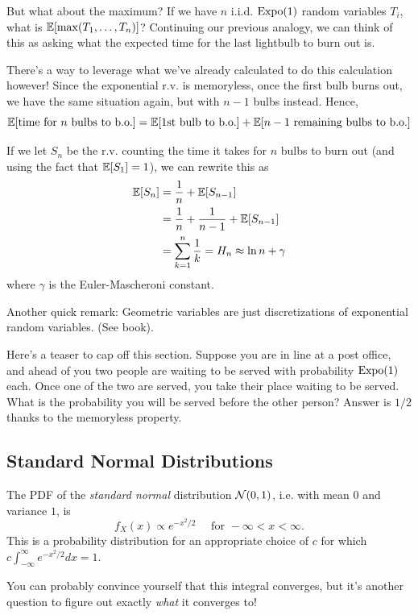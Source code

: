 \documentclass[11 pt]{scrartcl}
\begin{document}
But what about the maximum? If we have $n$ i.i.d. $\text{Expo}(1)$ random variables $T_i$, what is $\mathbb E[\max(T_1, \dots, T_n)]$? Continuing our previous analogy, we can think of this as asking what the expected time for the last lightbulb to burn out is. 

There's a way to leverage what we've already calculated to do this calculation however! Since the exponential r.v. is memoryless, once the first bulb burns out, we have the same situation again, but with $n-1$ bulbs instead. Hence,   
\[ \mathbb E[\text{time for }n\text{ bulbs to b.o.}] = \mathbb E[\text{1st bulb to b.o.}] + \mathbb E[n-1\text{ remaining bulbs to b.o.}]\]

If we let $S_n$ be the r.v. counting the time it takes for $n$ bulbs to burn out (and using the fact that $\mathbb E[S_1] = 1$), we can rewrite this as 
\begin{align*}
    \mathbb E[S_n] &= \dfrac{1}{n} + \mathbb E[S_{n-1}] \\ 
             &= \dfrac{1}{n} + \dfrac{1}{n-1} + \mathbb E[S_{n-1}] \\ 
             &= \sum_{k=1}^n \dfrac{1}{k} = H_n \approx \ln n + \gamma 
\end{align*}
where $\gamma$ is the Euler-Mascheroni constant. 

Another quick remark: Geometric variables are just discretizations of exponential random variables. (See book). 

Here's a teaser to cap off this section. Suppose you are in line at a post office, and ahead of you two people are waiting to be served with probability $\text{Expo}(1)$ each. Once one of the two are served, you take their place waiting to be served. What is the probability you will be served before the other person? Answer is $1/2$ thanks to the memoryless property. 

\subsection{Standard Normal Distributions}
\begin{definition}
    The PDF of the \emph{standard normal} distribution $\mathcal{N}(0,1)$, i.e. with mean $0$ and variance $1$, is 
    \[ f_X(x) \propto e^{-x^2/2} \quad \text{ for } -\infty < x < \infty.\] 
    This is a probability distribution for an appropriate choice of $c$ for which $c\int_{-\infty}^\infty e^{-x^2/2}dx = 1$. 
\end{definition}

You can probably convince yourself that this integral converges, but it's another question to figure out exactly \emph{what} it converges to! 
\end{document}
